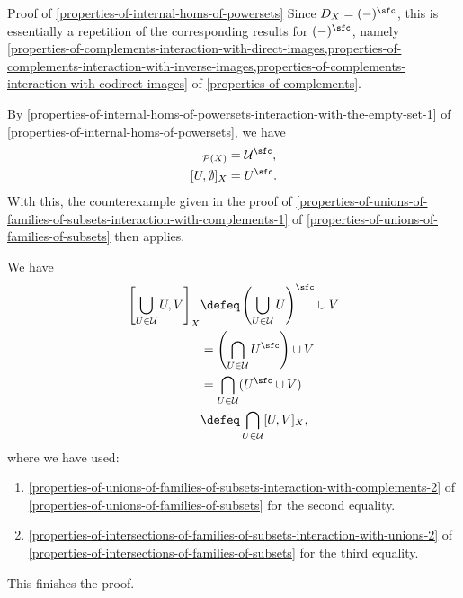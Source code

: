 \begin{Proof}{Proof of \cref{properties-of-internal-homs-of-powersets}}
    Since $D_{X}=(-)^{\sfc}$, this is essentially a repetition of the corresponding results for $(-)^{\sfc}$, namely \cref{properties-of-complements-interaction-with-direct-images,properties-of-complements-interaction-with-inverse-images,properties-of-complements-interaction-with-codirect-images} of \cref{properties-of-complements}.

    By \cref{properties-of-internal-homs-of-powersets-interaction-with-the-empty-set-1} of \cref{properties-of-internal-homs-of-powersets}, we have
    \begin{align*}
        [\mathcal{U},\emptyset]_{\mathcal{P}(X)} &= \mathcal{U}^{\sfc},\\
        [U,\emptyset]_{X}                        &= U^{\sfc}.
    \end{align*}
    With this, the counterexample given in the proof of \cref{properties-of-unions-of-families-of-subsets-interaction-with-complements-1} of \cref{properties-of-unions-of-families-of-subsets} then applies.

    We have
    \begin{align*}
        \left[\bigcup_{U\in\mathcal{U}}U,V\right]_{X} &\defeq \left(\bigcup_{U\in\mathcal{U}}U\right)^{\sfc}\cup V\\
                                                      &=      \left(\bigcap_{U\in\mathcal{U}}U^{\sfc}\right)\cup V\\
                                                      &=      \bigcap_{U\in\mathcal{U}}(U^{\sfc}\cup V)\\
                                                      &\defeq \bigcap_{U\in\mathcal{U}}[U,V]_{X},%
    \end{align*}
    where we have used:
    \begin{enumerate}
        \item\label{properties-of-internal-homs-of-powersets-interaction-with-unions-of-families-of-subsets-2-1}\cref{properties-of-unions-of-families-of-subsets-interaction-with-complements-2} of \cref{properties-of-unions-of-families-of-subsets} for the second equality.
        \item\label{properties-of-internal-homs-of-powersets-interaction-with-unions-of-families-of-subsets-2-2}\cref{properties-of-intersections-of-families-of-subsets-interaction-with-unions-2} of \cref{properties-of-intersections-of-families-of-subsets} for the third equality.
    \end{enumerate}
    This finishes the proof.


\end{Proof}
